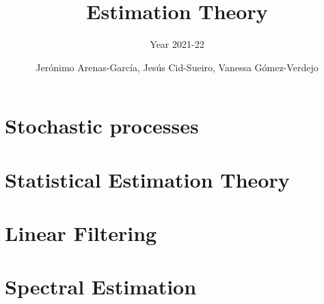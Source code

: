 \documentclass[graybox,envcountchap,sectrefs]{svmono_mod}
\begin{document}
\author{Jer\'onimo Arenas-Garc\'ia, Jes\'us Cid-Sueiro, Vanessa G\'omez-Verdejo}
\title{Estimation Theory}
\subtitle{Year 2021-22}

\frontmatter%

%
%
%
%
%

%
%
\chapter{Stochastic processes}

%
\chapter{Statistical Estimation Theory}
\label{Estimation Theory}
%
%
%
%
%
%

\chapter{Linear Filtering}
\label{cha:FiltradoLinea}
%

\chapter{Spectral Estimation}
\mainmatter %
\tableofcontents
% 


\backmatter%
%
%
\printindex
\end{document}
